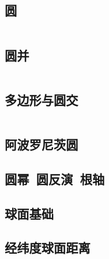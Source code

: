 \documentclass[titlepage, a4paper]{article}
\begin{document}
\begin{multicols}{2}
\begin{spacing}{0.6}
				
				\subsection{圆}
					\inputminted{cpp}{src/Geometry/circle.cpp}
				\subsection{圆并}
					\inputminted{cpp}{src/Geometry/圆并.cpp}
				\subsection{多边形与圆交}
					\inputminted{cpp}{src/Geometry/多边形和圆的交.cpp}
				\begin{small}
				\subsection{阿波罗尼茨圆}
					
				\subsection{圆幂~圆反演~根轴}
					
				\subsection{球面基础}
					
				\end{small}
				\subsection{经纬度球面距离}
					\inputminted{cpp}{src/Geometry/经纬度求球面最短距离.cpp}

\end{spacing}
\end{multicols}
\end{document}
